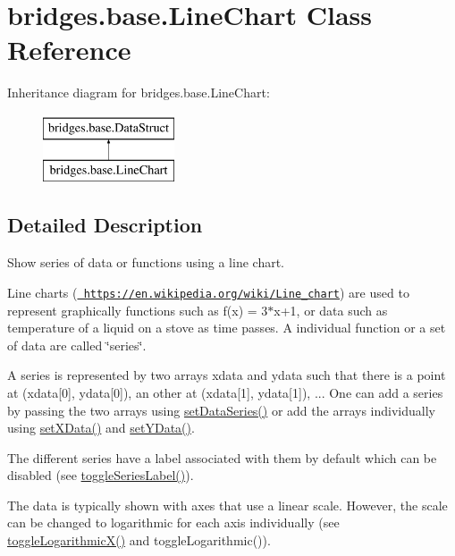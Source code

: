 \hypertarget{classbridges_1_1base_1_1_line_chart}{}\section{bridges.\+base.\+Line\+Chart Class Reference}
\label{classbridges_1_1base_1_1_line_chart}
Inheritance diagram for bridges.\+base.\+Line\+Chart\+:\begin{figure}[H]
\begin{center}
\leavevmode
\includegraphics[height=2.000000cm]{classbridges_1_1base_1_1_line_chart}
\end{center}
\end{figure}


\subsection{Detailed Description}
Show series of data or functions using a line chart. 

Line charts (\href{https://en.wikipedia.org/wiki/Line_chart}{\texttt{ https\+://en.\+wikipedia.\+org/wiki/\+Line\+\_\+chart}}) are used to represent graphically functions such as f(x) = 3$\ast$x+1, or data such as temperature of a liquid on a stove as time passes. A individual function or a set of data are called \char`\"{}series\char`\"{}.

A series is represented by two arrays xdata and ydata such that there is a point at (xdata\mbox{[}0\mbox{]}, ydata\mbox{[}0\mbox{]}), an other at (xdata\mbox{[}1\mbox{]}, ydata\mbox{[}1\mbox{]}), ... One can add a series by passing the two arrays using \mbox{\hyperlink{classbridges_1_1base_1_1_line_chart_a586e9953b13e51ab9e592acfb034887b}{set\+Data\+Series()}} or add the arrays individually using \mbox{\hyperlink{classbridges_1_1base_1_1_line_chart_a2918179283e8280d47abb43df3c59195}{set\+X\+Data()}} and \mbox{\hyperlink{classbridges_1_1base_1_1_line_chart_a3076dc99debb599529169de40815aba2}{set\+Y\+Data()}}.

The different series have a label associated with them by default which can be disabled (see \mbox{\hyperlink{classbridges_1_1base_1_1_line_chart_adae74cfb09585727a96cf74ddf74d098}{toggle\+Series\+Label()}}).

The data is typically shown with axes that use a linear scale. However, the scale can be changed to logarithmic for each axis individually (see \mbox{\hyperlink{classbridges_1_1base_1_1_line_chart_ad3e5e54c382ac605a81b6b61c250ad16}{toggle\+Logarithmic\+X()}} and toggle\+Logarithmic()).

